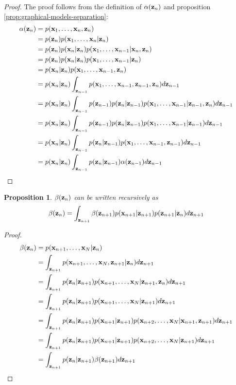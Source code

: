 \documentclass[11pt]{article}
\numberwithin{equation}{section}
\newcommand{\x}{{\bf x}}
\newcommand{\z}{{\bf z}}
\newtheorem{proposition}{Proposition}[section]
\begin{document}
\begin{proof}
	The proof follows from the definition of $\alpha(\z_n)$ and proposition \ref{prop:graphical-models-separation}:
	\begin{align}
		\alpha(\z_n) &= p(\x_1, \ldots, \x_n, \z_n) \\
		&= p(\z_n) p(\x_1, \ldots, \x_n \vert \z_n) \\
		&= p(\z_n) p(\x_n \vert \z_n) p(\x_1, \ldots, \x_{n-1} \vert \x_n, \z_n) \\
		&= p(\z_n) p(\x_n \vert \z_n) p(\x_1, \ldots, \x_{n-1} \vert \z_n) \\
		&= p(\x_n \vert \z_n) p(\x_1, \ldots, \x_{n-1}, \z_n) \\
		&= p(\x_n \vert \z_n) \int_{\z_{n-1}}p(\x_1, \ldots, \x_{n-1}, \z_{n-1}, \z_n) d\z_{n-1}\\
		&= p(\x_n \vert \z_n) \int_{\z_{n-1}} p(\z_{n-1})p(\z_n \vert \z_{n-1})p(\x_1, \ldots, \x_{n-1} \vert \z_{n-1}, \z_n) d\z_{n-1}\\
		&= p(\x_n \vert \z_n) \int_{\z_{n-1}} p(\z_{n-1})p(\z_n \vert \z_{n-1})p(\x_1, \ldots, \x_{n-1} \vert \z_{n-1}) d\z_{n-1}\\
		&= p(\x_n \vert \z_n) \int_{\z_{n-1}} p(\z_n \vert \z_{n-1})p(\x_1, \ldots, \x_{n-1}, \z_{n-1}) d\z_{n-1}\\
		&= p(\x_n \vert \z_n) \int_{\z_{n-1}} p(\z_n \vert \z_{n-1})\alpha(\z_{n-1}) d\z_{n-1}\\
	\end{align}
\end{proof}

\begin{proposition} \label{prop:beta-recursive}
	$\beta(\z_n)$ can be written recursively as
	\begin{equation}
		\beta(\z_n) = \int_{\z_{n+1}} \beta(\z_{n+1})p(\x_{n+1}\vert \z_{n+1}) p(\z_{n+1}\vert \z_n) d\z_{n+1}
	\end{equation} 
\end{proposition}

\begin{proof}
	\begin{align}
		\beta(\z_n) &= p(\x_{n+1}, \ldots, \x_N \vert \z_n)\\
		&= \int_{\z_{n+1}} p(\x_{n+1}, \ldots, \x_N, \z_{n+1} \vert \z_n) d\z_{n+1} \\
		&= \int_{\z_{n+1}} p(\z_n \vert \z_{n+1}) p(\x_{n+1}, \ldots, \x_N \vert \z_{n+1}, \z_n) d\z_{n+1} \\
		&= \int_{\z_{n+1}} p(\z_n \vert \z_{n+1}) p(\x_{n+1}, \ldots, \x_N \vert \z_{n+1}) d\z_{n+1} \\
		&= \int_{\z_{n+1}} p(\z_n \vert \z_{n+1}) p(\x_{n+1} \vert \z_{n+1}) p(\x_{n+2}, \ldots, \x_N \vert \x_{n+1}, \z_{n+1}) d\z_{n+1} \\
		&= \int_{\z_{n+1}} p(\z_n \vert \z_{n+1}) p(\x_{n+1} \vert \z_{n+1}) p(\x_{n+2}, \ldots, \x_N \vert \z_{n+1}) d\z_{n+1}\\
		&= \int_{\z_{n+1}} p(\z_n \vert \z_{n+1}) \beta(\z_{n+1}) d\z_{n+1}
	\end{align}
\end{proof}
\end{document}
